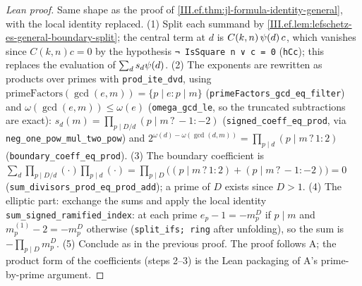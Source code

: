 \begin{proof}[Lean proof]
Same shape as the proof of \cref{III.ef.thm:jl-formula-identity-general}, with the local identity replaced. (1) Split each summand by \cref{III.ef.lem:lefschetz-es-general-boundary-split}; the central term at $d$ is $C(k,n)\,\psi(d)\,c$, which vanishes since $C(k,n)c=0$ by the hypothesis \texttt{¬ IsSquare n ∨ c = 0} (\texttt{hCc}); this replaces the evaluation of $\sum_ds_d\psi(d)$. (2) The exponents are rewritten as products over primes with \texttt{prod\_ite\_dvd}, using $\mathrm{primeFactors}(\gcd(e,m))=\{p\mid e: p\mid m\}$ (\texttt{primeFactors\_gcd\_eq\_filter}) and $\omega(\gcd(e,m))\le\omega(e)$ (\texttt{omega\_gcd\_le}, so the truncated subtractions are exact): $s_d(m)=\prod_{p\mid D/d}(p\mid m\,?\,-1:-2)$ (\texttt{signed\_coeff\_eq\_prod}, via \texttt{neg\_one\_pow\_mul\_two\_pow}) and $2^{\omega(d)-\omega(\gcd(d,m))}=\prod_{p\mid d}(p\mid m\,?\,1:2)$ (\texttt{boundary\_coeff\_eq\_prod}). (3) The boundary coefficient is $\sum_d\prod_{p\mid D/d}(\cdot)\prod_{p\mid d}(\cdot)=\prod_{p\mid D}\bigl((p\mid m\,?\,1:2)+(p\mid m\,?\,-1:-2)\bigr)=0$ (\texttt{sum\_divisors\_prod\_eq\_prod\_add}); a prime of $D$ exists since $D>1$. (4) The elliptic part: exchange the sums and apply the local identity \texttt{sum\_signed\_ramified\_index}: at each prime $e_p-1=-m^D_p$ if $p\mid m$ and $m^{(1)}_p-2=-m^D_p$ otherwise (\texttt{split\_ifs; ring} after unfolding), so the sum is $-\prod_{p\mid D}m^D_p$. (5) Conclude as in the previous proof. The proof follows A; the product form of the coefficients (steps 2--3) is the Lean packaging of A's prime-by-prime argument.
\end{proof}


